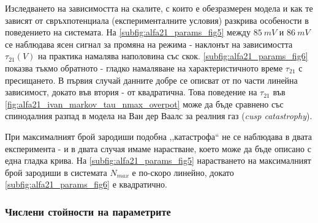 Изследването на зависимостта на скалите, с които е обезразмерен модела и как те зависят от свръхпотенциала (експерименталните условия) разкрива особености в поведението на системата.  На \autoref{subfig:alfa21_params_fig5} между $85~mV$ и $86~mV$ се наблюдава ясен сигнал за промяна на режима - наклонът на зависимостта $\tau_{21} (V)$ на практика намалява наполовина със скок. \autoref{subfig:alfa21_params_fig6} показва тъкмо обратното - гладко намаляване на характеристичното време $\tau_{21}$ с пресищането. В първия случай данните добре се описват от по части линейна зависимост, докато във втория - от квадратична.  Това поведение на $\tau_{21}$ във \autoref{fig:alfa21_ivan_markov_tau_nmax_overpot} може да бъде сравнено със спинодалния разпад в модела на Ван дер Ваалс за реалния газ (\textit{cusp catastrophy}).

При максималният брой зародиши подобна ,,катастрофа`` не се наблюдава в двата експеримента - и в двата случая имаме нарастване, което може да бъде описано с една гладка крива. На \autoref{subfig:alfa21_params_fig5} нарастването на максималният брой зародиши в системата $N_{max}$ е по-скоро линейно, докато \autoref{subfig:alfa21_params_fig6} е квадратично.

\subsubsection{Числени стойности на параметрите}

